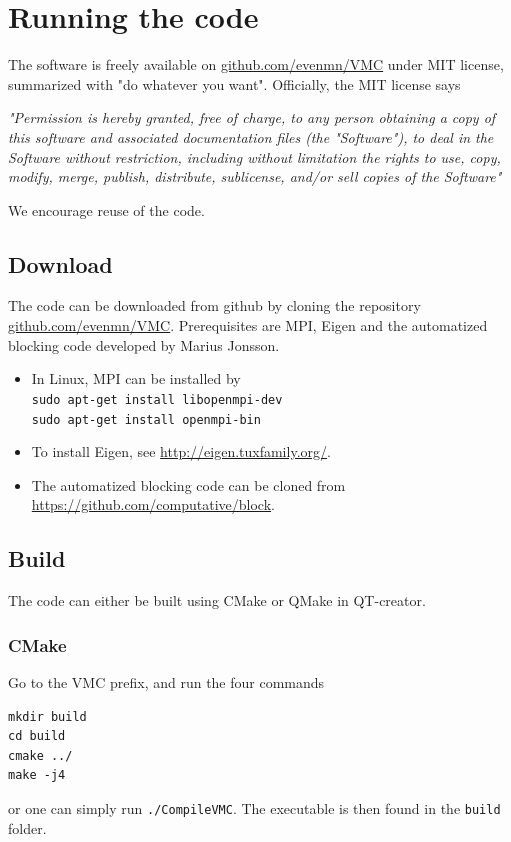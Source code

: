\section{Running the code}
The software is freely available on \url{github.com/evenmn/VMC} under MIT license, summarized with "do whatever you want". Officially, the MIT license says \cite{noauthor_mit_nodate}\bigskip

\textit{"Permission is hereby granted, free of charge, to any person obtaining a copy
	of this software and associated documentation files (the "Software"), to deal
	in the Software without restriction, including without limitation the rights
	to use, copy, modify, merge, publish, distribute, sublicense, and/or sell
	copies of the Software"}

We encourage reuse of the code.

\subsection{Download}
The code can be downloaded from github by cloning the repository \url{github.com/evenmn/VMC}. Prerequisites are MPI, Eigen and the automatized blocking code developed by Marius Jonsson. 
\begin{itemize}
	\item In Linux, MPI can be installed by\\
	\texttt{sudo apt-get install libopenmpi-dev}\\
	\texttt{sudo apt-get install openmpi-bin}
	\item To install Eigen, see \url{http://eigen.tuxfamily.org/}.
	\item The automatized blocking code can be cloned from \url{https://github.com/computative/block}.
\end{itemize}

\subsection{Build}
The code can either be built using CMake or QMake in QT-creator. 

\subsubsection{CMake}
Go to the VMC prefix, and run the four commands
\lstset{basicstyle=\scriptsize}
\begin{lstlisting}
mkdir build
cd build
cmake ../
make -j4
\end{lstlisting}
or one can simply run \texttt{./CompileVMC}. The executable is then found in the \texttt{build} folder.


